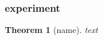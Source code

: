 \documentclass[notheorems]{beamer}
\newtheorem{theorem}{Theorem}
\begin{document}
\begin{frame}
\frametitle{experiment}

\begin{theorem}[name]
    text
\end{theorem}

\end{frame}
\end{document}
